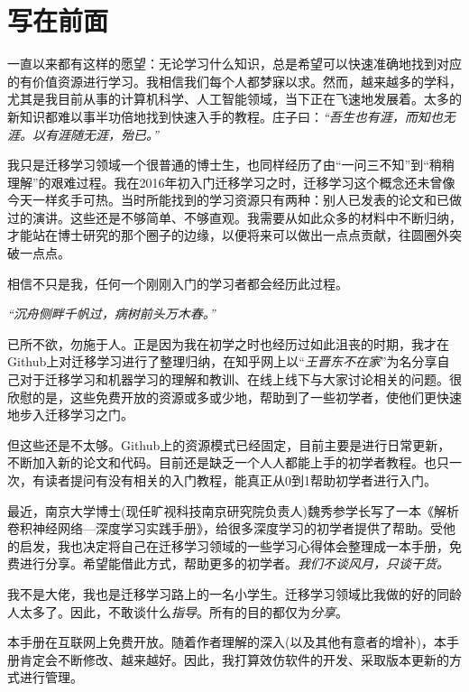 \newpage

\setcounter{page}{1}

\section*{写在前面}

一直以来都有这样的愿望：无论学习什么知识，总是希望可以快速准确地找到对应的有价值资源进行学习。我相信我们每个人都梦寐以求。然而，越来越多的学科，尤其是我目前从事的计算机科学、人工智能领域，当下正在飞速地发展着。太多的新知识都难以事半功倍地找到快速入手的教程。庄子曰：\textit{“吾生也有涯，而知也无涯。以有涯随无涯，殆已。”}

我只是迁移学习领域一个很普通的博士生，也同样经历了由“一问三不知”到“稍稍理解”的艰难过程。我在2016年初入门迁移学习之时，迁移学习这个概念还未曾像今天一样炙手可热。当时所能找到的学习资源只有两种：别人已发表的论文和已做过的演讲。这些还是不够简单、不够直观。我需要从如此众多的材料中不断归纳，才能站在博士研究的那个圈子的边缘，以便将来可以做出一点点贡献，往圆圈外突破一点点。

相信不只是我，任何一个刚刚入门的学习者都会经历此过程。

\textit{“沉舟侧畔千帆过，病树前头万木春。”}

已所不欲，勿施于人。正是因为我在初学之时也经历过如此沮丧的时期，我才在Github上对迁移学习进行了整理归纳，在知乎网上以“\textit{王晋东不在家}”为名分享自己对于迁移学习和机器学习的理解和教训、在线上线下与大家讨论相关的问题。很欣慰的是，这些免费开放的资源或多或少地，帮助到了一些初学者，使他们更快速地步入迁移学习之门。

但这些还是不太够。Github上的资源模式已经固定，目前主要是进行日常更新，不断加入新的论文和代码。目前还是缺乏一个人人都能上手的初学者教程。也只一次，有读者提问有没有相关的入门教程，能真正从0到1帮助初学者进行入门。

最近，南京大学博士(现任旷视科技南京研究院负责人)魏秀参学长写了一本《解析卷积神经网络—深度学习实践手册》，给很多深度学习的初学者提供了帮助。受他的启发，我也决定将自己在迁移学习领域的一些学习心得体会整理成一本手册，免费进行分享。希望能借此方式，帮助更多的初学者。\textit{我们不谈风月，只谈干货。}

我不是大佬，我也是迁移学习路上的一名小学生。迁移学习领域比我做的好的同龄人太多了。因此，不敢谈什么\textit{指导}。所有的目的都仅为\textit{分享}。

本手册在互联网上免费开放。随着作者理解的深入(以及其他有意者的增补)，本手册肯定会不断修改、越来越好。因此，我打算效仿软件的开发、采取版本更新的方式进行管理。

